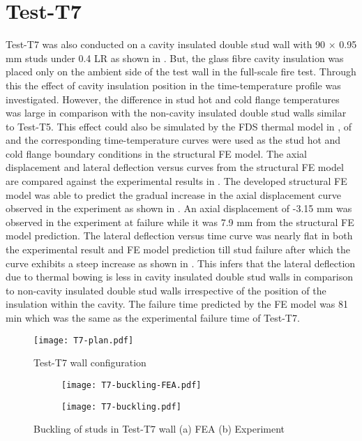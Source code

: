 \section*{Test-T7}

Test-T7 was also conducted on a cavity insulated double stud wall with 90 $\times$ 0.95 mm studs under 0.4 LR as shown in . But, the glass fibre cavity insulation was placed only on the ambient side of the test wall in the full-scale fire test. Through this the effect of cavity insulation position in the time-temperature profile was investigated. However, the difference in stud hot and cold flange temperatures was large in comparison with the non-cavity insulated double stud walls similar to Test-T5. This effect could also be simulated by the FDS thermal model in , of  and the corresponding time-temperature curves were used as the stud hot and cold flange boundary conditions in the structural FE model. The axial displacement and lateral deflection versus curves from the structural FE model are compared against the experimental results in . The developed structural FE model was able to predict the gradual increase in the axial displacement curve observed in the experiment as shown in . An axial displacement of -3.15 mm was observed in the experiment at failure while it was 7.9 mm from the structural FE model prediction. The lateral deflection versus time curve was nearly flat in both the experimental result and FE model prediction till stud failure after which the curve exhibits a steep increase as shown in . This infers that the lateral deflection due to thermal bowing is less in cavity insulated double stud walls in comparison to non-cavity insulated double stud walls irrespective of the position of the insulation within the cavity. The failure time predicted by the FE model was 81 min which was the same as the experimental failure time of Test-T7.
\begin{figure}[!htbp]
	\centering
			\texttt{[image: T7-plan.pdf]}\\
		\caption{Test-T7 wall configuration}
		\label{fig:T7-plan-FEA}
\end{figure}
\begin{figure}[!htbp]
	\centering
	\begin{subfigure}[b]{0.85\textwidth}
		\centering
		\texttt{[image: T7-buckling-FEA.pdf]}
		\caption{}
		\label{subfig:T7-buckling-FEA}
	\end{subfigure}
	\begin{subfigure}[b]{0.5\textwidth}
		\centering
		\texttt{[image: T7-buckling.pdf]}
		\caption{}
		\label{subfig:T7-buckling-FEA-Exp}
	\end{subfigure}
	   \caption{Buckling of studs in Test-T7 wall (a) FEA (b) Experiment}
	   \label{fig:T7-buckling-FE-vs-Exp}
\end{figure} 
